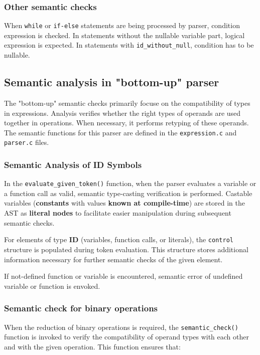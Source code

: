 \documentclass[a4paper, 11pt]{article}
\begin{document}
\subsubsection{Other semantic checks}
When \verb|while| or \verb|if-else| statements are being processed by parser, condition expression is checked.
In statements without the nullable variable part, logical expression is expected. In statements with \verb|id_without_null|,
condition has to be nullable.

\subsection{Semantic analysis in "bottom-up" parser}
The "bottom-up" semantic checks primarily focuse on the compatibility of types in expressions. 
Analysis verifies whether the right types of operands are used together in operations. 
When necessary, it performs retyping of these operands. 
The semantic functions for this parser are defined in the \verb|expression.c| and \verb|parser.c| files.
\subsubsection{Semantic Analysis of ID Symbols}
In the \verb|evaluate_given_token()| function, when the parser evaluates a variable or a function call as valid, semantic 
type-casting verification is performed. Castable variables (\textbf{constants} with values \textbf{known at compile-time}) 
are stored in the AST as \textbf{literal nodes} to facilitate easier manipulation during subsequent semantic checks.
\par
For elements of type \textbf{ID} (variables, function calls, or literals), the \verb|control| structure is populated during token 
evaluation. This structure stores additional information necessary for further semantic checks of the given element.
\par
If not-defined function or variable is encountered, semantic error of undefined variable or function is envoked.


\subsubsection{Semantic check for binary operations}
When the reduction of binary operations is required, the \verb|semantic_check()| function is invoked to verify the compatibility 
of operand types with each other and with the given operation. This function ensures that:
\end{document}
